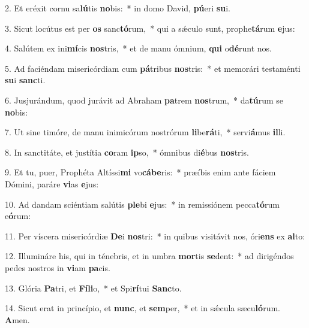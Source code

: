 
2. Et eréxit cornu sa\textbf{lú}tis \textbf{no}bis:~* in domo David, \textbf{pú}eri \textbf{su}i.

3. Sicut locútus est per \textbf{os} sanc\textbf{tó}rum,~* qui a s\'{\ae}culo sunt, prophe\textbf{tá}rum \textbf{e}jus:

4. Salútem ex ini\textbf{mí}cis \textbf{nos}tris,~* et de manu ómnium, \textbf{qui} o\textbf{dé}runt nos.

5. Ad faciéndam misericórdiam cum \textbf{pá}tribus \textbf{nos}tris:~* et memorári testaménti \textbf{su}i \textbf{sanc}ti.

6. Jusjurándum, quod jurávit ad Abraham \textbf{pa}trem \textbf{nos}trum,~* da\textbf{tú}rum se \textbf{no}bis:

7. Ut sine timóre, de manu inimicórum nostrórum \textbf{li}be\textbf{rá}ti,~* servi\textbf{á}mus \textbf{il}li.

8. In sanctitáte, et justítia \textbf{co}ram \textbf{ip}so,~* ómnibus di\textbf{é}bus \textbf{nos}tris.

9. Et tu, puer, Prophéta Altíssi\textbf{mi} vo\textbf{cá}\textbf{be}ris:~* præíbis enim ante fáciem Dómini, paráre \textbf{vi}as \textbf{e}jus:

10. Ad dandam sciéntiam salútis \textbf{ple}bi \textbf{e}jus:~* in remissiónem pecca\textbf{tó}rum e\textbf{ó}rum:

11. Per víscera misericórdiæ \textbf{De}i \textbf{nos}tri:~* in quibus visitávit nos, óri\textbf{ens} ex \textbf{al}to:

12. Illumináre his, qui in ténebris, et in umbra \textbf{mor}tis \textbf{se}dent:~* ad dirigéndos pedes nostros in \textbf{vi}am \textbf{pa}cis.

13. Glória \textbf{Pa}tri, et \textbf{Fí}\textbf{li}o,~* et Spi\textbf{rí}tui \textbf{Sanc}to.

14. Sicut erat in princípio, et \textbf{nunc}, et \textbf{sem}per,~* et in s\'{\ae}cula sæcu\textbf{ló}rum. \textbf{A}men.